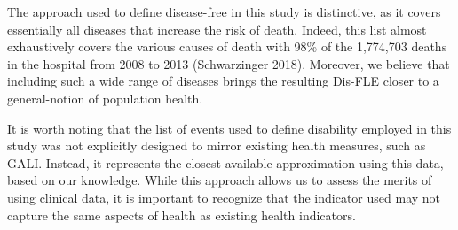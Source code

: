 \documentclass{article}
\begin{document}
The approach used to define disease-free in this study is distinctive,
as it covers essentially all diseases that increase the risk of death.
Indeed, this list almost exhaustively covers the various causes of death
with 98\% of the 1,774,703 deaths in the hospital from 2008 to 2013
(Schwarzinger 2018). Moreover, we believe that including such a wide
range of diseases brings the resulting Dis-FLE closer to a
general-notion of population health.

It is worth noting that the list of events used to define disability
employed in this study was not explicitly designed to mirror existing
health measures, such as GALI. Instead, it represents the closest
available approximation using this data, based on our knowledge. While
this approach allows us to assess the merits of using clinical data, it
is important to recognize that the indicator used may not capture the
same aspects of health as existing health indicators.
\end{document}
